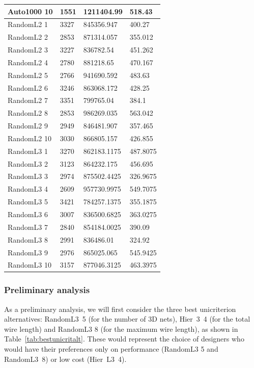 \documentclass{svmult}
\begin{document}
\begin{small}
\begin{longtable}{p{2.3cm}p{1.5cm}p{2cm}p{1.3cm}}
    Auto1000 10 & 1551 & 1211404.99 & 518.43 \\
    \hline
    RandomL2 1 & 3327 & 845356.947 & 400.27 \\
    RandomL2 2 & 2853 & 871314.057 & 355.012 \\
    RandomL2 3 & 3227 & 836782.54 & 451.262 \\
    RandomL2 4 & 2780 & 881218.65 & 470.167 \\
    RandomL2 5 & 2766 & 941690.592 & 483.63 \\
    RandomL2 6 & 3246 & 863068.172 & 428.25 \\
    RandomL2 7 & 3351 & 799765.04 & 384.1 \\
    RandomL2 8 & 2853 & 986269.035 & 563.042 \\
    RandomL2 9 & 2949 & 846481.907 & 357.465 \\
    RandomL2 10 & 3030 & 866805.157 & 426.855 \\
    \hline
    RandomL3 1 & 3270 & 862183.1175 & 487.8075 \\
    RandomL3 2 & 3123 & 864232.175 & 456.695 \\
    RandomL3 3 & 2974 & 875502.4425 & 326.9675 \\
    RandomL3 4 & 2609 & 957730.9975 & 549.7075 \\
    RandomL3 5 & 3421 & 784257.1375 & 355.1875 \\
    RandomL3 6 & 3007 & 836500.6825 & 363.0275 \\
    RandomL3 7 & 2840 & 854184.0025 & 390.09 \\
    RandomL3 8 & 2991 & 836486.01 & 324.92 \\
    RandomL3 9 & 2976 & 865025.065 & 545.9425 \\
    RandomL3 10 & 3157 & 877046.3125 & 463.3975 \\
    \hline
\end{longtable}
\end{small}

\subsubsection{Preliminary analysis}
As a preliminary analysis, we will first consider the three best unicriterion alternatives: RandomL3~5 (for the number of 3D nets), Hier~3~4 (for the total wire length) and RandomL3 8 (for the maximum wire length), as shown in Table~\ref{tab:bestunicritalt}. These would represent the choice of designers who would have their preferences only on performance (RandomL3 5 and RandomL3~8) or low cost (Hier~L3~4).
\end{document}
